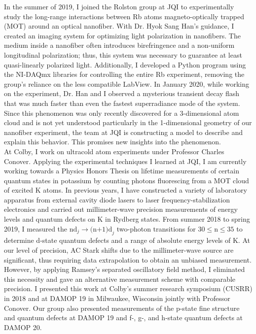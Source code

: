 \documentclass[12pt]{article}
\begin{document}
In the summer of 2019, I joined the Rolston group at JQI to experimentally study the long-range interactions between Rb atoms magneto-optically trapped (MOT) around an optical nanofiber. With Dr. Hyok Sang Han's guidance, I created an imaging system for optimizing light polarization in nanofibers. The medium inside a nanofiber often introduces birefringence and a non-uniform longitudinal polarization; thus, this system was necessary to guarantee at least  quasi-linearly polarized light. Additionally, I developed a Python program using the NI-DAQmx libraries for controlling the entire Rb experiment, removing the group's reliance on the less compatible LabView. In January 2020, while working on the experiment, Dr. Han and I observed a mysterious transient decay flash that was much faster than even the fastest superradiance mode of the system. Since this phenomenon was only recently discovered for a 3-dimensional atom cloud and is not yet understood particularly in the 1-dimensional geometry of our nanofiber experiment, the team at JQI is constructing a model to describe and explain this behavior. This promises new insights into the phenomenon.  \\ 

At Colby, I work on ultracold atom experiments under Professor Charles Conover. Applying the experimental techniques I learned at JQI, I am currently working towards a Physics Honors Thesis on lifetime measurements of certain quantum states in potassium by counting photons fluorescing from a MOT cloud of excited K atoms. In previous years, I have constructed a variety of laboratory apparatus from external cavity diode lasers to laser frequency-stabilization electronics and carried out millimeter-wave precision measurements of energy levels and quantum defects on K in Rydberg states. From summer 2018 to spring 2019, I measured the $\mbox{nd}_{j} \to \mbox{(n+1)d}_{j}$ two-photon transitions for $\mbox{30} \leq \mbox{n} \leq \mbox{35}$ to determine d-state quantum defects and a range of absolute energy levels of K. At our level of precision, AC Stark shifts due to the millimeter-wave source are significant, thus requiring data extrapolation to obtain an unbiased measurement. However, by applying Ramsey's separated oscillatory field method, I eliminated this necessity and gave an alternative measurement scheme with comparable precision. I presented this work at Colby's summer research symposium (CUSRR) in 2018 and at DAMOP 19 in Milwaukee, Wisconsin jointly with Professor Conover. Our group also presented measurements of the p-state fine structure and quantum defects at DAMOP 19 and f-, g-, and h-state quantum defects at DAMOP 20. \\ 
\end{document}
